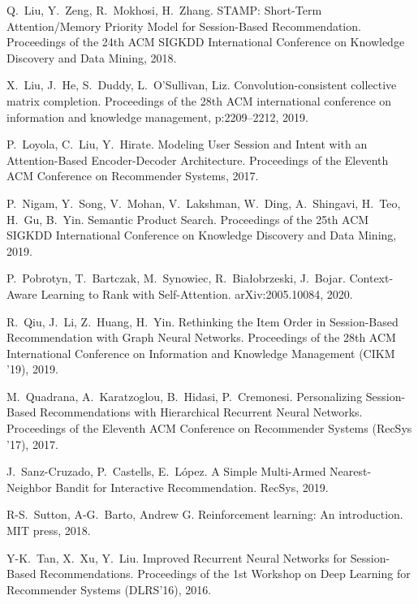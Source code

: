 \documentclass[11pt, dvipdfmx]{article}
\begin{document}
\begin{thebibliography}{10}
\begin{small}
 Q.~Liu, Y.~Zeng, R.~Mokhosi, H.~Zhang.
\newblock STAMP: Short-Term Attention/Memory Priority Model for Session-Based Recommendation. \newblock Proceedings of the 24th ACM SIGKDD International Conference on Knowledge Discovery and Data Mining, 2018.

 X.~Liu, J.~He, S.~Duddy, L.~O'Sullivan, Liz.
\newblock Convolution-consistent collective matrix completion.
\newblock Proceedings of the 28th ACM international conference on information and knowledge management, p:2209--2212, 2019.

 P.~Loyola, C.~Liu, Y.~Hirate.
\newblock Modeling User Session and Intent with an Attention-Based Encoder-Decoder Architecture. 
\newblock Proceedings of the Eleventh ACM Conference on Recommender Systems, 2017.

 P.~Nigam, Y.~Song, V.~Mohan, V.~Lakshman, W.~Ding, A.~Shingavi, H.~Teo, H.~Gu, B.~Yin. \newblock Semantic Product Search. \newblock Proceedings of the 25th ACM SIGKDD International Conference on Knowledge Discovery and Data Mining, 2019.

 P.~Pobrotyn, T.~Bartczak, M.~Synowiec, R.~Białobrzeski, J.~Bojar.
\newblock Context-Aware Learning to Rank with Self-Attention. 
\newblock arXiv:2005.10084, 2020.

R.~Qiu, J.~Li, Z.~Huang, H.~Yin.
\newblock Rethinking the Item Order in Session-Based Recommendation with Graph Neural Networks.
\newblock Proceedings of the 28th ACM International Conference on Information and Knowledge Management (CIKM ’19), 2019.

M.~Quadrana, A.~Karatzoglou, B.~Hidasi, P.~Cremonesi.
\newblock Personalizing Session-Based Recommendations with Hierarchical Recurrent Neural Networks.
\newblock Proceedings of the Eleventh ACM Conference on Recommender Systems (RecSys '17), 2017.

 J.~Sanz-Cruzado, P.~Castells, E.~L\'{o}pez.
\newblock A Simple Multi-Armed Nearest-Neighbor Bandit for Interactive Recommendation.
\newblock RecSys, 2019. 

 R-S.~Sutton, A-G.~Barto, Andrew G.
\newblock Reinforcement learning: An introduction.
\newblock MIT press, 2018.

 Y-K.~Tan, X.~Xu, Y.~Liu.
\newblock Improved Recurrent Neural Networks for Session-Based Recommendations.
\newblock Proceedings of the 1st Workshop on Deep Learning for Recommender Systems (DLRS'16), 2016.


\end{small}
\end{thebibliography}
\end{document}
